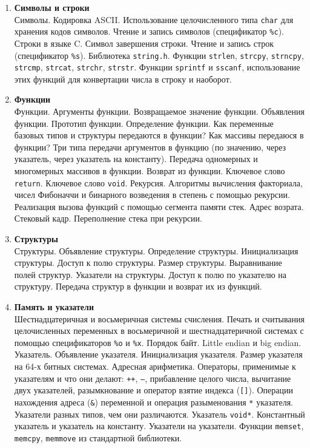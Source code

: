 \documentclass{article}
\begin{document}
\begin{enumerate}
\item \textbf{Символы и строки}\\
Символы. Кодировка ASCII. Использование целочисленного типа \texttt{char} для хранения кодов символов. Чтение и запись символов (спецификатор \texttt{\%с}). Строки в языке C. Символ завершения строки. Чтение и запись строк (спецификатор \texttt{\%s}). Библиотека \texttt{string.h}. Функции \texttt{strlen}, \texttt{strcpy}, \texttt{strncpy}, \texttt{strcmp}, \texttt{strcat}, \texttt{strchr}, \texttt{strstr}. Функции \texttt{sprintf} и \texttt{sscanf}, использование этих функций для конвертации числа в строку и наоборот.


\item \textbf{Функции}\\
Функции. Аргументы функции. Возвращаемое значение функции. Объявления функции. Прототип функции. Определение функции. Как переменные базовых типов и структуры передаются в функции? Как массивы передаюся в функции? Три типа передачи аргументов в функцию (по значению, через указатель, через указатель на константу). Передача одномерных и многомерных массивов в функции. Возврат из функции. Ключевое слово \texttt{return}. Ключевое слово \texttt{void}. Рекурсия. Алгоритмы вычисления факториала, чисел Фибоначчи и бинарного возведения в степень с помощью рекурсии. Реализация вызова функций с помощью сегмента памяти стек. Адрес возрата. Стековый кадр. Переполнение стека при рекурсии. 

\item \textbf{Структуры}\\
Структуры. Объявление структуры. Определение структуры. Инициализация структуры. Доступ к полю структуры. Размер структуры. Выравнивание полей структур. Указатели на структуры. Доступ к полю по указателю на структуру. Передача структур в функции и возврат их из функций. 

\item \textbf{Память и указатели}\\
Шестнадцатеричная и восьмеричная системы счисления. Печать и считывания целочисленных переменных в восьмеричной и шестнадцатеричной системах с помощью спецификаторов \texttt{\%o} и \texttt{\%x}. Порядок байт. Little endian и big endian. Указатель. Объявление указателя. Инициализация указателя. Размер указателя на 64-х битных системах. Адресная арифметика. Операторы, применимые к указателям и что они делают: \texttt{++}, \texttt{--}, прибавление целого числа, вычитание двух указателей, разымкнование и оператор взятие индекса (\texttt{[]}). Операции нахождения адреса (\texttt{\&}) переменной и операция разыменования \texttt{*} указателя. Указатели разных типов, чем они различаются. Указатель \texttt{void*}. Константный указатель и указатель на константу. Указатели на указатели. Функции \texttt{memset}, \texttt{memcpy}, \texttt{memmove} из стандартной библиотеки.


\end{enumerate}
\end{document}

